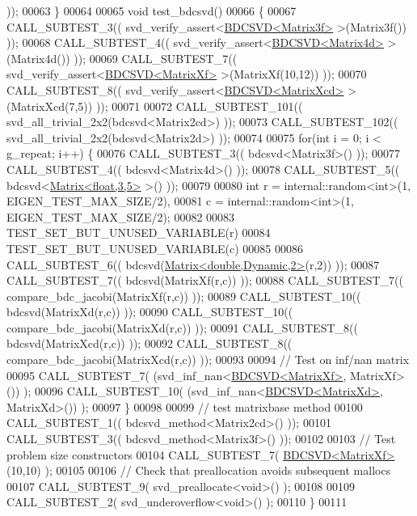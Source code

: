 \begin{DoxyCode}
      ));
00063 \}
00064 
00065 \textcolor{keywordtype}{void} test\_bdcsvd()
00066 \{
00067   CALL\_SUBTEST\_3(( svd\_verify\_assert<\hyperlink{group___s_v_d___module_class_eigen_1_1_b_d_c_s_v_d}{BDCSVD<Matrix3f>}  >(Matrix3f()) ));
00068   CALL\_SUBTEST\_4(( svd\_verify\_assert<\hyperlink{group___s_v_d___module_class_eigen_1_1_b_d_c_s_v_d}{BDCSVD<Matrix4d>}  >(Matrix4d()) ));
00069   CALL\_SUBTEST\_7(( svd\_verify\_assert<\hyperlink{group___s_v_d___module_class_eigen_1_1_b_d_c_s_v_d}{BDCSVD<MatrixXf>}  >(MatrixXf(10,12)) ));
00070   CALL\_SUBTEST\_8(( svd\_verify\_assert<\hyperlink{group___s_v_d___module_class_eigen_1_1_b_d_c_s_v_d}{BDCSVD<MatrixXcd>} >(MatrixXcd(7,5)) ));
00071   
00072   CALL\_SUBTEST\_101(( svd\_all\_trivial\_2x2(bdcsvd<Matrix2cd>) ));
00073   CALL\_SUBTEST\_102(( svd\_all\_trivial\_2x2(bdcsvd<Matrix2d>) ));
00074 
00075   \textcolor{keywordflow}{for}(\textcolor{keywordtype}{int} i = 0; i < g\_repeat; i++) \{
00076     CALL\_SUBTEST\_3(( bdcsvd<Matrix3f>() ));
00077     CALL\_SUBTEST\_4(( bdcsvd<Matrix4d>() ));
00078     CALL\_SUBTEST\_5(( bdcsvd<\hyperlink{group___core___module_class_eigen_1_1_matrix}{Matrix<float,3,5>} >() ));
00079 
00080     \textcolor{keywordtype}{int} r = internal::random<int>(1, EIGEN\_TEST\_MAX\_SIZE/2),
00081         c = internal::random<int>(1, EIGEN\_TEST\_MAX\_SIZE/2);
00082     
00083     TEST\_SET\_BUT\_UNUSED\_VARIABLE(r)
00084     TEST\_SET\_BUT\_UNUSED\_VARIABLE(c)
00085     
00086     CALL\_SUBTEST\_6((  bdcsvd(\hyperlink{group___core___module_class_eigen_1_1_matrix}{Matrix<double,Dynamic,2>}(r,2)) ));
00087     CALL\_SUBTEST\_7((  bdcsvd(MatrixXf(r,c)) ));
00088     CALL\_SUBTEST\_7((  compare\_bdc\_jacobi(MatrixXf(r,c)) ));
00089     CALL\_SUBTEST\_10(( bdcsvd(MatrixXd(r,c)) ));
00090     CALL\_SUBTEST\_10(( compare\_bdc\_jacobi(MatrixXd(r,c)) ));
00091     CALL\_SUBTEST\_8((  bdcsvd(MatrixXcd(r,c)) ));
00092     CALL\_SUBTEST\_8((  compare\_bdc\_jacobi(MatrixXcd(r,c)) ));
00093 
00094     \textcolor{comment}{// Test on inf/nan matrix}
00095     CALL\_SUBTEST\_7(  (svd\_inf\_nan<\hyperlink{group___s_v_d___module_class_eigen_1_1_b_d_c_s_v_d}{BDCSVD<MatrixXf>}, MatrixXf>()) );
00096     CALL\_SUBTEST\_10( (svd\_inf\_nan<\hyperlink{group___s_v_d___module_class_eigen_1_1_b_d_c_s_v_d}{BDCSVD<MatrixXd>}, MatrixXd>()) );
00097   \}
00098 
00099   \textcolor{comment}{// test matrixbase method}
00100   CALL\_SUBTEST\_1(( bdcsvd\_method<Matrix2cd>() ));
00101   CALL\_SUBTEST\_3(( bdcsvd\_method<Matrix3f>() ));
00102 
00103   \textcolor{comment}{// Test problem size constructors}
00104   CALL\_SUBTEST\_7( \hyperlink{group___s_v_d___module_class_eigen_1_1_b_d_c_s_v_d}{BDCSVD<MatrixXf>}(10,10) );
00105 
00106   \textcolor{comment}{// Check that preallocation avoids subsequent mallocs}
00107   CALL\_SUBTEST\_9( svd\_preallocate<void>() );
00108 
00109   CALL\_SUBTEST\_2( svd\_underoverflow<void>() );
00110 \}
00111 
\end{DoxyCode}
